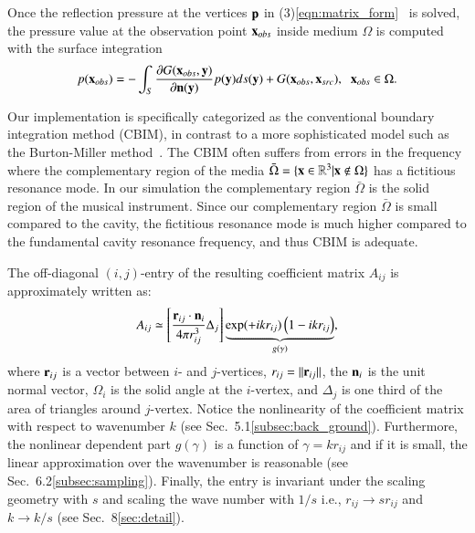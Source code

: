Once the reflection pressure at the vertices $\mathbf{p}$ in (3)\eqref{eqn:matrix_form}\fi~ is solved, the pressure value at the observation point $\mathbf{x}_{obs}$ inside medium $\Omega$ is computed with the surface integration 
%
\begin{align}
\label{eqn:bem_interior}
p(\mathbf{x}_{obs}) 
= 
- \int_S  \frac{\partial G(\mathbf{x}_{obs},\mathbf{y})}{\partial \mathbf{n}(\mathbf{y})} p(\mathbf{y}) ds(\mathbf{y})
 + G(\mathbf{x}_{obs},\mathbf{x}_{src}),\;\;\mathbf{x}_{obs}\in \Omega.
\end{align}


Our implementation is specifically categorized as the conventional boundary integration method (CBIM), in contrast to a more sophisticated model such as the Burton-Miller method~\cite{burton1971application}. 
%
The CBIM often suffers from errors in the frequency where the complementary region of the media $\bar{\Omega}=\{\mathbf{x}\in\mathbb{R}^3| \mathbf{x}\notin \Omega \}$ has a fictitious resonance mode. 
%
In our simulation the complementary region $\bar{\Omega}$ is the solid region of the musical instrument.
%
Since our complementary region $\bar{\Omega}$ is small compared to the cavity, the fictitious resonance mode is much higher compared to the fundamental cavity resonance frequency, and thus CBIM is adequate.





The off-diagonal $(i,j)$-entry of the resulting coefficient matrix $A_{ij}$ is approximately written as:
%
\begin{eqnarray}
\label{eqn:mat_entry}
A_{ij} 
\simeq
\left[ \frac{\mathbf{r}_{ij}\cdot \mathbf{n}_i}{4\pi r^3_{ij}}\Delta_j\right]  \underbrace{\exp(+ikr_{ij})\left(1-ikr_{ij}\right)}_{g(\gamma)},
\end{eqnarray}
%
where $\mathbf{r}_{ij}$ is a vector between $i$- and $j$-vertices, $r_{ij}=||\mathbf{r}_{ij}||$, the $\mathbf{n}_i$ is the unit normal vector, $\Omega_i$ is the solid angle at the $i$-vertex, and $\Delta_j$ is one third of the area of triangles around $j$-vertex. 
%
Notice the nonlinearity of the coefficient matrix with respect to wavenumber $k$ (see Sec.~5.1\ref{subsec:back_ground}\fi). 
%
Furthermore, the nonlinear dependent part $g(\gamma)$ is a function of $\gamma=k r_{ij}$ and if it is small, the linear approximation over the wavenumber is reasonable (see Sec.~6.2\ref{subsec:sampling}\fi).
%
Finally, the entry is invariant under the scaling geometry with $s$ and scaling the wave number with $1/s$ i.e., $r_{ij}\rightarrow s r_{ij}$ and  $k\rightarrow k/s $ (see Sec.~8\ref{sec:detail}\fi).














